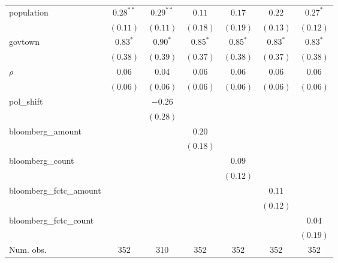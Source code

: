 \begin{table}[!h]
\begin{center}
\begin{tabular}{l c c c c c c }
population              & $0.28^{**}$  & $0.29^{**}$  & $0.11$       & $0.17$       & $0.22$       & $0.27^{*}$   \\
                        & $(0.11)$     & $(0.11)$     & $(0.18)$     & $(0.19)$     & $(0.13)$     & $(0.12)$     \\
govtown                 & $0.83^{*}$   & $0.90^{*}$   & $0.85^{*}$   & $0.85^{*}$   & $0.83^{*}$   & $0.83^{*}$   \\
                        & $(0.38)$     & $(0.39)$     & $(0.37)$     & $(0.38)$     & $(0.37)$     & $(0.38)$     \\
$\rho$                  & $0.06$       & $0.04$       & $0.06$       & $0.06$       & $0.06$       & $0.06$       \\
                        & $(0.06)$     & $(0.06)$     & $(0.06)$     & $(0.06)$     & $(0.06)$     & $(0.06)$     \\
pol\_shift              &              & $-0.26$      &              &              &              &              \\
                        &              & $(0.28)$     &              &              &              &              \\
bloomberg\_amount       &              &              & $0.20$       &              &              &              \\
                        &              &              & $(0.18)$     &              &              &              \\
bloomberg\_count        &              &              &              & $0.09$       &              &              \\
                        &              &              &              & $(0.12)$     &              &              \\
bloomberg\_fctc\_amount &              &              &              &              & $0.11$       &              \\
                        &              &              &              &              & $(0.12)$     &              \\
bloomberg\_fctc\_count  &              &              &              &              &              & $0.04$       \\
                        &              &              &              &              &              & $(0.19)$     \\
\midrule
Num. obs.               & 352          & 310          & 352          & 352          & 352          & 352          \\

\end{tabular}
\end{center}
\end{table}
